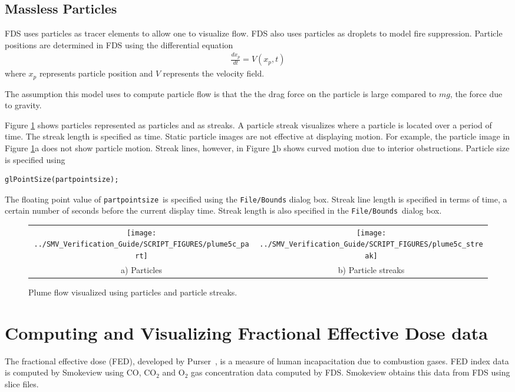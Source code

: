\documentclass[11pt,twoside]{book}
\begin{document}
\subsection{Massless Particles}
FDS uses particles as tracer elements to allow one to visualize flow.  FDS
also uses particles as droplets to model fire suppression.  Particle positions are determined in FDS using the differential equation
\begin{eqnarray}
\frac{dx_p}{dt}=V(x_p,t)
\end{eqnarray}
where $x_p$ represents particle position and $V$ represents the velocity field.

The assumption this model uses to compute particle flow is that the the drag force on the particle is large compared to $mg$, the force due to gravity.

Figure \ref{figpart}
shows particles represented as particles and
as streaks.
A particle streak visualizes where a particle is located over a period of time.  The streak length is specified as time.
Static particle images are not effective at displaying motion.  For example, the particle image in Figure \ref{figpart}a does not show particle motion.  Streak lines, however, in Figure \ref{figpart}b shows curved motion due to interior obstructions.
Particle size is
specified using
\begin{lstlisting}
glPointSize(partpointsize);
\end{lstlisting}
The floating point value of {\tt partpointsize}\ is specified using the {\tt File/Bounds}
dialog box.  Streak line length is specified in terms of time, a certain number of seconds before the current display time.  Streak length is also specified in the {\tt File/Bounds}\ dialog box.

\begin{figure}[\figoptions]
\begin{center}
\begin{tabular}{cc}
\texttt{[image: ../SMV\_Verification\_Guide/SCRIPT\_FIGURES/plume5c\_part]}&
\texttt{[image: ../SMV\_Verification\_Guide/SCRIPT\_FIGURES/plume5c\_streak]}\\
a) Particles&b) Particle streaks\\
\end{tabular}
\end{center}
\caption{Plume flow visualized using particles and particle streaks.}
\label{figpart}%
\end{figure}

\section{Computing and Visualizing Fractional Effective Dose data}
The fractional effective dose (FED), developed by
Purser~\cite{SFPE:Purser}, is a measure of human incapacitation
due to combustion gases.  FED index data is computed by Smokeview using CO,
$\mathrm{CO_2}$ and $\mathrm{O_2}$ gas concentration data computed
by FDS. Smokeview obtains this data from FDS using slice files.
\end{document}
